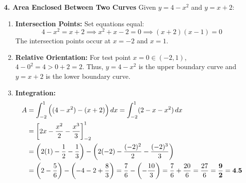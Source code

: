 \textbf{4. Area Enclosed Between Two Curves}
Given $y = 4 - x^2$ and $y = x + 2$:
\begin{enumerate}
    \item \textbf{Intersection Points:} Set equations equal:
    \begin{equation*}
    4 - x^2 = x + 2 \implies x^2 + x - 2 = 0 \implies (x + 2)(x - 1) = 0
    \end{equation*}
    The intersection points occur at $x = -2$ and $x = 1$.
    \item \textbf{Relative Orientation:} For test point $x = 0 \in (-2, 1)$, $4 - 0^2 = 4 > 0 + 2 = 2$. Thus, $y = 4 - x^2$ is the upper boundary curve and $y = x + 2$ is the lower boundary curve.
    \item \textbf{Integration:}
    \begin{align*}
    A &= \int_{-2}^1 \Big( (4 - x^2) - (x + 2) \Big) \,dx = \int_{-2}^1 (2 - x - x^2) \,dx \\
    &= \left[ 2x - \frac{x^2}{2} - \frac{x^3}{3} \right]_{-2}^1 \\
    &= \left( 2(1) - \frac{1}{2} - \frac{1}{3} \right) - \left( 2(-2) - \frac{(-2)^2}{2} - \frac{(-2)^3}{3} \right) \\
    &= \left( 2 - \frac{5}{6} \right) - \left( -4 - 2 + \frac{8}{3} \right) = \frac{7}{6} - \left( -\frac{10}{3} \right) = \frac{7}{6} + \frac{20}{6} = \frac{27}{6} = \mathbf{\frac{9}{2} = 4.5}
    \end{align*}
\end{enumerate}

